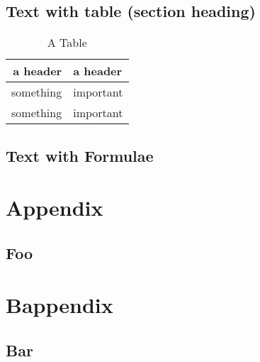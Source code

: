 \documentclass[format=a4-sdq]{sdqdiss}
\begin{document}
\section[tocentry={Text with table (TOC entry)},%
head={Text with table (page head)}]%
{Text with table (section heading)}
\Blindtext

\begin{table}
\centering
\begin{tabular}{rl}
\toprule
\textbf{a header} & \textbf{a header}\\
\midrule
something & important\\
something & important\\
\bottomrule
\end{tabular}
\caption{A Table}
\label{tab:one}
\end{table}

\section{Text with Formulae}
\blindmathpaper[8]

\printbibliography[heading=bibintoc]

\appendix
\chapter{Appendix}

\section{Foo}
\Blindtext

\chapter{Bappendix}

\section{Bar}
\Blindtext
\end{document}
